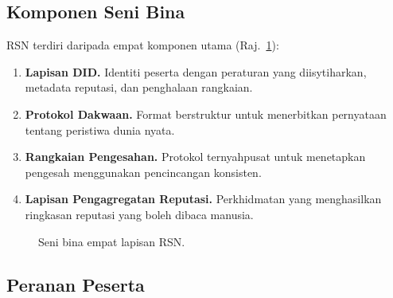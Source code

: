 \documentclass[11pt,a4paper,twocolumn]{article}
\begin{document}
\subsection{Komponen Seni Bina}

RSN terdiri daripada empat komponen utama (Raj.~\ref{fig:architecture}):
\begin{enumerate}[nosep]
\item \textbf{Lapisan DID.} Identiti peserta dengan peraturan yang diisytiharkan, metadata reputasi, dan penghalaan rangkaian.
\item \textbf{Protokol Dakwaan.} Format berstruktur untuk menerbitkan pernyataan tentang peristiwa dunia nyata.
\item \textbf{Rangkaian Pengesahan.} Protokol ternyahpusat untuk menetapkan pengesah menggunakan pencincangan konsisten.
\item \textbf{Lapisan Pengagregatan Reputasi.} Perkhidmatan yang menghasilkan ringkasan reputasi yang boleh dibaca manusia.
\end{enumerate}

\begin{figure}[ht]
\centering
{}
\caption{Seni bina empat lapisan RSN.}
\label{fig:architecture}
\end{figure}

\subsection{Peranan Peserta}
\end{document}
